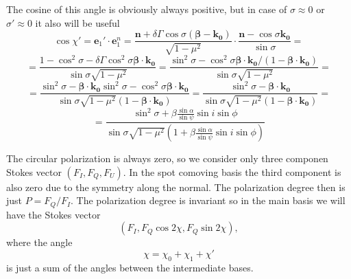 \documentclass[14pt]{article}
\newcommand{\be}{\begin{equation}}
\newcommand{\ee}{\end{equation}}
\begin{document}
			The cosine of this angle is obviously always positive, but in case of $\sigma\approx0$ or $ \sigma'\approx0$ it also will be useful  
			$$
				\cos\chi'=\bm{e}_1'\cdot \bm{e}_1^n =\frac{\bm n + \delta  \Gamma \cos\sigma (\bm \beta - \bm{k_0} ) }{\sqrt{1-\mu^2} }\cdot
				\frac{\bm n - \cos \sigma  \bm{k_0} }{\sin{\sigma}} = $$
			$$
				=\frac{1-\cos^2\sigma-\delta \Gamma \cos^2 \sigma \bm \beta \cdot \bm{k_0} }{\sin{\sigma}\sqrt{1-\mu^2} } 
				=\frac{\sin^2\sigma-  \cos^2 \sigma \bm \beta \cdot \bm{k_0} /(1-\bm \beta \cdot \bm{k_0}) }{\sin{\sigma}\sqrt{1-\mu^2} } =
			$$
			$$
				=\frac{\sin^2\sigma -\bm \beta \cdot \bm{k_0} \sin^2\sigma - \cos^2 \sigma \bm \beta \cdot \bm{k_0} }{\sin{\sigma}\sqrt{1-\mu^2} (1-\bm \beta \cdot \bm{k_0}) } 
				=\frac{\sin^2\sigma -\bm \beta \cdot \bm{k_0}  }{\sin{\sigma}\sqrt{1-\mu^2} (1-\bm \beta \cdot \bm{k_0}) } =
			$$\be
				=\frac{\sin^2\sigma + \beta \frac{\sin \alpha }{\sin\psi} \sin i \sin \phi }{\sin{\sigma}\sqrt{1-\mu^2} (1+ \beta \frac{\sin \alpha }{\sin\psi} \sin i \sin \phi) } 
			\ee


			The circular polarization is always zero, so we consider only three componen Stokes vector $(F_I,F_Q,F_U)$.
			In the spot comoving basis the third component is also zero due to the symmetry along the normal.
			The polarization degree then is just $P=F_Q/F_I$.
			The polarization degree is invariant so in the main basis we will have the Stokes vector
			\be
				(F_I, F_Q \cos{2\chi},F_Q \sin{2\chi}),
			\ee
		    where the angle
			\be
			\chi=\chi_0+\chi_1+ \chi'\ee
			is just a sum of the angles between the intermediate bases.
\end{document}
